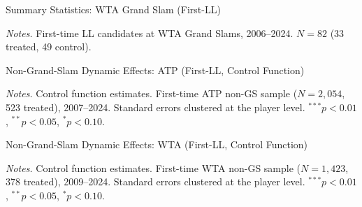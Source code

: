 \begin{table}[htbp]
\centering
\caption{Summary Statistics: WTA Grand Slam (First-LL)}
\label{tab:sumstats_gs_wta}
\begin{threeparttable}
\small
\begin{adjustbox}{max width=\textwidth}

\end{adjustbox}
\begin{tablenotes}
\footnotesize
\item \textit{Notes.} First-time LL candidates at WTA Grand Slams, 2006--2024. $N = 82$ (33 treated, 49 control).
\end{tablenotes}
\end{threeparttable}
\end{table}


\begin{table}[htbp]
\centering
\caption{Non-Grand-Slam Dynamic Effects: ATP (First-LL, Control Function)}
\label{tab:dynamic_nongs_atp}
\begin{threeparttable}
\small

\begin{tablenotes}
\footnotesize
\item \textit{Notes.} Control function estimates. First-time ATP non-GS sample ($N = 2{,}054$, 523 treated), 2007--2024. Standard errors clustered at the player level. $^{***}p<0.01$, $^{**}p<0.05$, $^{*}p<0.10$.
\end{tablenotes}
\end{threeparttable}
\end{table}

\begin{table}[htbp]
\centering
\caption{Non-Grand-Slam Dynamic Effects: WTA (First-LL, Control Function)}
\label{tab:dynamic_nongs_wta}
\begin{threeparttable}
\small

\begin{tablenotes}
\footnotesize
\item \textit{Notes.} Control function estimates. First-time WTA non-GS sample ($N = 1{,}423$, 378 treated), 2009--2024. Standard errors clustered at the player level. $^{***}p<0.01$, $^{**}p<0.05$, $^{*}p<0.10$.
\end{tablenotes}
\end{threeparttable}
\end{table}

